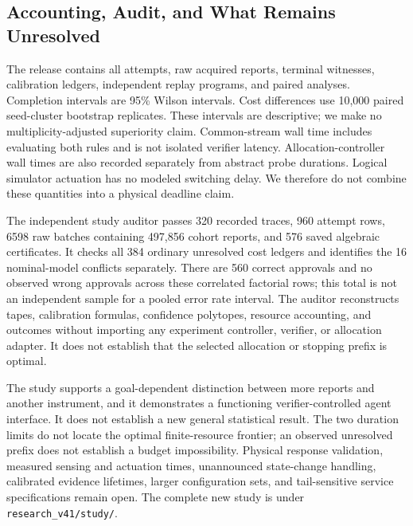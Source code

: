 \subsection{Accounting, Audit, and What Remains Unresolved}

The release contains all attempts, raw acquired reports, terminal witnesses,
calibration ledgers, independent replay programs, and paired analyses.
Completion intervals are 95\% Wilson intervals. Cost differences use 10,000
paired seed-cluster bootstrap replicates. These intervals are descriptive;
we make no multiplicity-adjusted superiority claim. Common-stream wall time
includes evaluating both rules and is not isolated verifier latency.
Allocation-controller wall times are also recorded separately from abstract
probe durations. Logical simulator actuation has no modeled switching delay.
We therefore do not combine these quantities into a physical deadline claim.

The independent study auditor passes 320 recorded traces, 960 attempt
rows, 6598 raw batches containing 497,856 cohort reports, and 576 saved
algebraic certificates. It checks all 384 ordinary unresolved cost ledgers
and identifies the 16 nominal-model conflicts separately. There are 560
correct approvals and no observed wrong approvals across these correlated
factorial rows; this total is not an independent sample for a pooled error
rate interval. The auditor reconstructs tapes, calibration formulas,
confidence polytopes, resource accounting, and outcomes without importing
any experiment controller, verifier, or allocation adapter. It does not
establish that the selected allocation or stopping prefix is optimal.

The study supports a goal-dependent distinction between more reports and
another instrument, and it demonstrates a functioning verifier-controlled
agent interface. It does not establish a new general statistical result.
The two duration limits do not locate the optimal finite-resource frontier;
an observed unresolved prefix does not establish a budget impossibility.
Physical response validation, measured sensing and actuation times,
unannounced state-change handling, calibrated evidence lifetimes, larger
configuration sets, and tail-sensitive service specifications remain open.
The complete new study is under \texttt{research\_v41/study/}.
